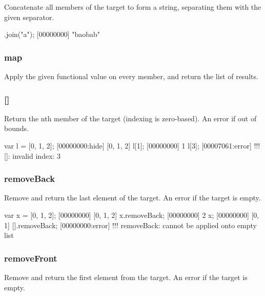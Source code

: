 Concatenate all members of the target to form a string, separating
them with the given separator.

\begin{urbiscript}
["b", "ob", "b"].join("a");
[00000000] "baobab"
\end{urbiscript}

\subsubsection{map}

Apply the given functional value on every member, and return the list
of results.


\subsubsection{[]}
\label{sec:std-list-nth}

Return the nth member of the target (indexing is zero-based). An error
if out of bounds.

\begin{urbiscript}
var l = [0, 1, 2];
[00000000:hide] [0, 1, 2]
l[1];
[00000000] 1
l[3];
[00007061:error] !!! []: invalid index: 3
\end{urbiscript}

\subsubsection{removeBack}

Remove and return the last element of the target. An error if the
target is empty.

\begin{urbiscript}
var x = [0, 1, 2];
[00000000] [0, 1, 2]
x.removeBack;
[00000000] 2
x;
[00000000] [0, 1]
[].removeBack;
[00000000:error] !!! removeBack: cannot be applied onto empty list
\end{urbiscript}

\subsubsection{removeFront}

Remove and return the first element from the target. An error if the
target is empty.

